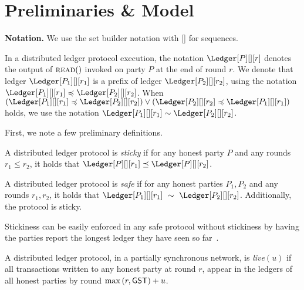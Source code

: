 \section{Preliminaries \& Model}

\textbf{Notation.}
We use the set builder notation with [] for sequences.

In a distributed ledger protocol execution, the notation
$\Ledger[P][][r]$ denotes the output of $\textsc{read}()$
invoked on party $P$ at the end of round $r$. 
We denote that ledger
$\Ledger[P_1][][r_1]$ is a prefix of ledger $\Ledger[P_2][][r_2]$,
using the notation
$\Ledger[P_1][][r_1] \preccurlyeq \Ledger[P_2][][r_2]$. When
$(\Ledger[P_1][][r_1] \preccurlyeq \Ledger[P_2][][r_2]) \lor (\Ledger[P_2][][r_2] \preccurlyeq \Ledger[P_1][][r_1])$ holds,
we use the notation $\Ledger[P_1][][r_1] \sim \Ledger[P_2][][r_2]$.



First, we note a few preliminary definitions.




\begin{definition}[Stickiness]
  A distributed ledger protocol is \emph{sticky} if
  for any honest party $P$ and any rounds $r_1 \leq r_2$,
  it holds that $\Ledger[P][][r_1] \preceq \Ledger[P][][r_2]$.
\end{definition}

\begin{definition}[Safety]
  A distributed ledger protocol is \emph{safe} if
  for any honest parties $P_1, P_2$ and any rounds $r_1, r_2$, it holds that
  $\Ledger[P_1][][r_1]~\sim~\Ledger[P_2][][r_2]$. Additionally, the
  protocol is sticky.
\end{definition}


Stickiness can be easily enforced in any safe protocol
without stickiness by having the parties report the longest
ledger they have seen so far~\cite{streamlet}.


\begin{definition}
  A distributed ledger protocol, in a partially synchronous network,
  is \emph{live}$(u)$ if all transactions written to any honest party
  at round $r$, appear in the ledgers of all honest parties by round %
  $\max{(r,\textsf{GST})} + u$.
\end{definition}

